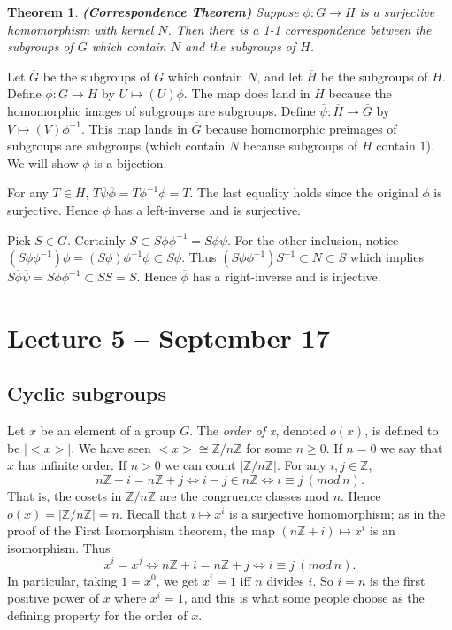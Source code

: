 \documentclass[letterpaper]{article}
\newtheorem{theorem}{Theorem}[section]
\newenvironment{proof}[1][Proof]{\begin{trivlist}
\item[\hskip \labelsep {\bfseries #1}]}{\end{trivlist}}
\begin{document}
\begin{theorem}
\emph{\textbf{(Correspondence Theorem)}}
Suppose $\phi \colon G \rightarrow H$ is a surjective homomorphism
with kernel $N$. Then there is a 1-1 correspondence between the
subgroups of $G$ which contain $N$ and the subgroups of $H$.
\end{theorem}
\begin{proof}
Let $\overline G$ be the subgroups of $G$ which contain $N$, and
let $\overline H$ be the subgroups of $H$. Define $\overline \phi
\colon \overline G \rightarrow \overline H$ by $U \mapsto (U)\phi$.
The map does land in $\overline H$ because the homomorphic images
of subgroups are subgroups. Define $\overline \psi \colon \overline
H \rightarrow \overline G$ by $V \mapsto (V)\phi^{-1}$. This map
lands in $\overline G$ because homomorphic preimages of subgroups
are subgroups (which contain $N$ because subgroups of $H$ contain
$1$). We will show $\overline \phi$ is a bijection.

For any $T \in \overline H$, $T\overline\psi \overline\phi =
T\phi^{-1}\phi = T$. The last equality holds since the original
$\phi$ is surjective. Hence $\overline\phi$ has a left-inverse and
is surjective.

Pick $S \in \overline G$.  Certainly $S \subset S\phi\phi^{-1} =
S\overline\phi \overline\psi$. For the other inclusion, notice
$(S\phi\phi^{-1})\phi = (S\phi)\phi^{-1}\phi \subset S\phi$. Thus
$(S\phi\phi^{-1})S^{-1} \subset N \subset S$ which implies
$S\overline\phi \overline\psi = S\phi\phi^{-1} \subset SS = S$.
Hence $\overline\phi$ has a right-inverse and is injective.
\end{proof}

\section{Lecture 5 -- September 17}

\subsection{Cyclic subgroups}

Let $x$ be an element of a group $G$. The \emph{order of x}, denoted
$o(x)$, is defined to be $|{<}x{>}|$. We have seen ${<}x{>} \cong
\mathbb{Z}/n\mathbb{Z}$ for some $n \ge 0$. If $n = 0$ we say that
$x$ has infinite order. If $n > 0$ we can count $|\mathbb{Z}/n\mathbb{Z}|$.
For any $i, j \in \mathbb{Z}$,
\[
n\mathbb{Z} + i = n\mathbb{Z} + j \Longleftrightarrow i - j \in n\mathbb{Z} 
\Longleftrightarrow i \equiv j\ (mod\ n).
\]
That is, the cosets in $\mathbb{Z}/n\mathbb{Z}$ are the congruence
classes mod $n$. Hence $o(x) = |\mathbb{Z}/n\mathbb{Z}| = n$. Recall
that $i \mapsto x^i$ is a surjective homomorphism; as in the proof
of the First Isomorphism theorem, the map $(n\mathbb{Z} + i) \mapsto
x^i$ is an isomorphism. Thus
\[
x^i = x^j \Longleftrightarrow n\mathbb{Z} + i = n\mathbb{Z} + j
\Longleftrightarrow i \equiv j\ (mod\ n).
\]
In particular, taking $1 = x^0$, we get $x^i = 1$ iff $n$ divides
$i$. So $i = n$ is the first positive power of $x$ where $x^i = 1$,
and this is what some people choose as the defining property for
the order of $x$.
\end{document}
